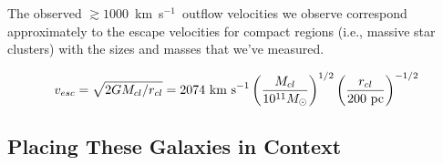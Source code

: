 \documentclass[apj]{emulateapj}
\newcommand{\kms}{km~s$^{-1}$}
\begin{document}
The observed $\gtrsim1000$~\kms\ outflow velocities we observe correspond
approximately to the escape velocities for compact regions (i.e.,
massive star clusters) with the sizes and masses that we've measured.

\begin{equation}
v_{esc} = \sqrt{2GM_{cl}/r_{cl}} = 2074~\textnormal{km~s}^{-1} \\%
\left({M_{cl}\over10^{11} M_{\odot}}\right)^{1/2} 
\left({r_{cl}\over200~\textnormal{pc}}\right)^{-1/2}
\label{eq:vesc}
\end{equation}


% 




\subsection{Placing These Galaxies in Context}
\end{document}
